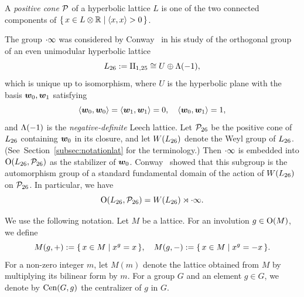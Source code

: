 \documentclass{amsart} %
\begin{document}
A \emph{positive cone} $\mathord{\mathcal{P}}$ of a hyperbolic lattice $L$
is one of the two connected components 
of $\{\,{x\in L\otimes \mathord{\mathbb{R}}}\mid {\langle x, x \rangle>0} \,\}$.
\par
The group $\cdot \infty$ was considered by Conway~\cite{MR690711}
 in his study of the orthogonal group of an even unimodular hyperbolic lattice
 \[
 L_{26}:=\mathrm{II}_{1,25} \cong U\oplus \Lambda(-1), 
\]
which is unique up to isomorphism,
where $U$ is the hyperbolic plane with the basis $\boldsymbol{w}_0, \boldsymbol{w}_1$
satisfying 
%
\begin{equation}\label{eq:w0w1}
\langle \boldsymbol{w}_0, \boldsymbol{w}_0 \rangle=\langle \boldsymbol{w}_1, \boldsymbol{w}_1 \rangle=0, 
\quad \langle \boldsymbol{w}_0, \boldsymbol{w}_1 \rangle=1, 
\end{equation}
%
and $\Lambda(-1)$ is the \emph{negative-definite} Leech lattice.
Let $\mathord{\mathcal{P}}_{26}$ be 
the positive cone of $L_{26}$ containing $\boldsymbol{w}_0$ in its closure, 
and 
let $W(L_{26})$ denote the Weyl group of $L_{26}$.
(See~Section~\ref{subsec:notationlat} for the terminology.)
Then $\cdot \infty$ is embedded into $\mathord{\mathrm{O}}(L_{26}, \mathord{\mathcal{P}}_{26})$
as the stabilizer of $\boldsymbol{w}_0$.
Conway~\cite{MR690711} showed that 
 this subgroup is
the automorphism group
of a standard fundamental domain of the action of $W(L_{26})$ on $\mathord{\mathcal{P}}_{26}$.
In particular, we have 
\[
\mathord{\mathrm{O}}(L_{26}, \mathord{\mathcal{P}}_{26})= W(L_{26}) \rtimes\cdot \infty.
\]
\par
%
We use the following notation.
Let $M$ be a lattice.
For an involution $g\in \mathord{\mathrm{O}}(M)$, we define
%
\begin{equation}\label{eq:Mgpm}
M(g, +):=\{\,{x\in M}\mid {x^g=x} \,\},
\quad
M(g, -):=\{\,{x\in M}\mid {x^g=-x} \,\}.
\end{equation}
%
For  a non-zero integer $m$,
let $M(m)$ denote the lattice obtained from $M$ by multiplying its bilinear form by
$m$.
For a group $G$ and an element $g\in G$,
we denote by $\mathrm{Cen}(G, g)$ the centralizer of $g$ in $G$.
%
%
\end{document}
